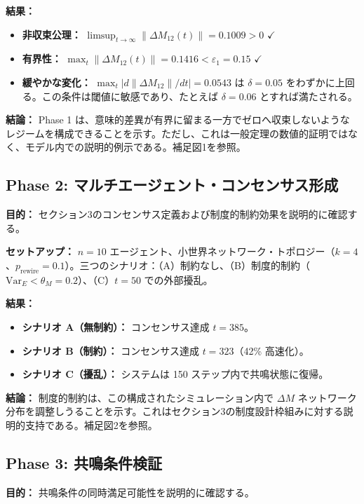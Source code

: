 \documentclass[11pt,a4paper]{article}
\theoremstyle{definition}
\begin{document}
\textbf{結果：}
\begin{itemize}
\item \textbf{非収束公理：} $\limsup_{t \to \infty} \|\Delta M_{12}(t)\| = 0.1009 > 0$ $\checkmark$
\item \textbf{有界性：} $\max_t \|\Delta M_{12}(t)\| = 0.1416 < \varepsilon_1 = 0.15$ $\checkmark$
\item \textbf{緩やかな変化：} $\max_t |d\|\Delta M_{12}\|/dt| = 0.0543$ は $\delta = 0.05$ をわずかに上回る。この条件は閾値に敏感であり、たとえば $\delta = 0.06$ とすれば満たされる。
\end{itemize}

\textbf{結論：} Phase 1 は、意味的差異が有界に留まる一方でゼロへ収束しないようなレジームを構成できることを示す。ただし、これは一般定理の数値的証明ではなく、モデル内での説明的例示である。補足図1を参照。

\subsection{Phase 2: マルチエージェント・コンセンサス形成}

\textbf{目的：} セクション3のコンセンサス定義および制度的制約効果を説明的に確認する。

\textbf{セットアップ：} $n = 10$ エージェント、小世界ネットワーク・トポロジー（$k = 4$、$p_{\text{rewire}} = 0.1$）。三つのシナリオ：（A）制約なし、（B）制度的制約（$\text{Var}_E < \theta_M = 0.2$）、（C）$t = 50$ での外部擾乱。

\textbf{結果：}
\begin{itemize}
\item \textbf{シナリオ A（無制約）：} コンセンサス達成 $t = 385$。
\item \textbf{シナリオ B（制約）：} コンセンサス達成 $t = 323$（42\% 高速化）。
\item \textbf{シナリオ C（擾乱）：} システムは 150 ステップ内で共鳴状態に復帰。
\end{itemize}

\textbf{結論：} 制度的制約は、この構成されたシミュレーション内で $\Delta M$ ネットワーク分布を調整しうることを示す。これはセクション3の制度設計枠組みに対する説明的支持である。補足図2を参照。

\subsection{Phase 3: 共鳴条件検証}

\textbf{目的：} 共鳴条件の同時満足可能性を説明的に確認する。
\end{document}
